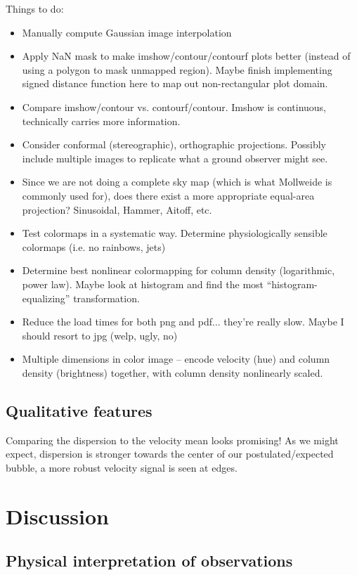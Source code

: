 \documentclass[10pt]{article}
\begin{document}
Things to do:
\begin{itemize}
    \item Manually compute Gaussian image interpolation
    \item Apply NaN mask to make imshow/contour/contourf plots better (instead of using a polygon to mask unmapped region).  Maybe finish implementing signed distance function here to map out non-rectangular plot domain.
    \item Compare imshow/contour vs. contourf/contour.  Imshow is continuous, technically carries more information.
    \item Consider conformal (stereographic), orthographic projections.    Possibly include multiple images to replicate what a ground observer might see.
    \item Since we are not doing a complete sky map (which is what Mollweide is commonly used for), does there exist a more appropriate equal-area projection? Sinusoidal, Hammer, Aitoff, etc.
    \item Test colormaps in a systematic way.  Determine physiologically sensible colormaps (i.e. no rainbows, jets)
    \item Determine best nonlinear colormapping for column density (logarithmic, power law).  Maybe look at histogram and find the most ``histogram-equalizing'' transformation.
    \item Reduce the load times for both png and pdf... they're really slow.  Maybe I should resort to jpg (welp, ugly, no)
    \item Multiple dimensions in color image -- encode velocity (hue) and column density (brightness) together, with column density nonlinearly scaled.
\end{itemize}

\subsection{Qualitative features}

Comparing the dispersion to the velocity mean looks promising!  As we might expect, dispersion is stronger towards the center of our postulated/expected bubble, a more robust velocity signal is seen at edges.

\section{Discussion}

\subsection{Physical interpretation of observations}
\end{document}
